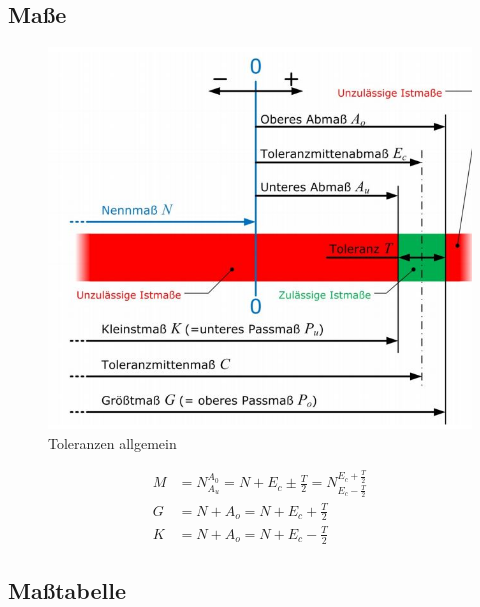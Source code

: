 \subsection*{Maße}

\begin{figure}[h]
	\centering
	\includegraphics[scale=0.6]{Toleranzen_1.jpg}
	\caption{Toleranzen allgemein}
\end{figure}

\begin{align*}
M &= N^{A_0}_{A_u} = N + E_c \pm \frac{T}{2} = N^{E_c + \frac{T}{2}}_{E_c - \frac{T}{2}} \\
G &= N + A_o = N + E_c + \frac{T}{2} \\
K &= N + A_o = N + E_c - \frac{T}{2}
\end{align*}

\newpage

\subsection*{Maßtabelle}

